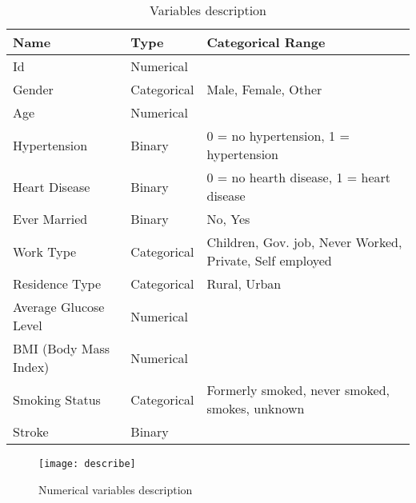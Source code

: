 \documentclass[12pt, a4paper]{article}
\begin{document}
\begin{table}[H]
\hskip-1.0cm\begin{tabular}{l|l|l}
Name                       & Type    & Categorical Range \\ \hline
Id                         & Numerical   &  \\
Gender                     & Categorical  & Male, Female, Other   \\
Age                        & Numerical & \\
Hypertension               & Binary   & 0 = no hypertension, 1 = hypertension   \\
Heart Disease              & Binary   & 0 = no hearth disease, 1 = heart disease  \\
Ever Married               & Binary  & No, Yes   \\
Work Type                  & Categorical  & Children, Gov. job, Never Worked, Private, Self employed   \\
Residence Type             & Categorical  & Rural, Urban   \\
Average Glucose Level      & Numerical &   \\
BMI (Body Mass Index)      & Numerical &   \\
Smoking Status             & Categorical  & Formerly smoked, never smoked, smokes, unknown   \\
Stroke                     & Binary   &   \\
\end{tabular}
\caption{Variables description}
\end{table}

\begin{figure}[H]
  \centering
  \texttt{[image: describe]}
  \caption{Numerical variables description}
  \label{fig:numerical}
\end{figure}



\end{document}
